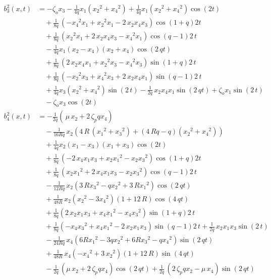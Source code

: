 \begin{align*}
b^2_3(x,t) &= -\zeta_o x_3 - \frac{1}{4q}{x_1\left({x_2}^2+{x_4}^2\right)}+ \frac{1}{4q}{x_1\left({x_2}^2 + {x_4}^2 \right) \cos(2t)}\\
&\quad + \frac{1}{8q}\,{\left(-{x_4}^2 x_1 + {x_2}^2 x_1 - 2\,x_2 x_4 x_3\right)\cos(1+q)2t}\\
&\quad +\frac{1}{8q}\,{\left
    ({x_2}^2x_1+2\,x_2x_4x_3-{x_4}^2x_1
   \right)\cos(q-1)2\,t}\\
&\quad - \frac{1}{4q}{x_1\left
    (x_2-x_4\right)\left(x_2+x_4\right)\cos
   (2\,qt)}\\
&\quad+\frac{1}{8q}\,{\left
    (2\,x_2x_4x_1+{x_2}^{2
    }x_3-{x_4}^2x_3\right)\sin(1+q)2\,t}\\
&\quad+\frac{1}{8q}\,{\left
    (-{x_2}^2x_3+{x_4}^2x_3+2\,x_2
    x_4x_1\right)\sin(q-1)2\,t}\\
&\quad+\frac{1}{4q}{x_3\left({
     x_2}^2+{x_4}^2\right
   )\sin(2\,t)}-\frac{1}{2q}\,{x_2
   x_4x_1\sin(2\,qt)}+\zeta_ox_1\sin(2\,t)\\
&\quad- \zeta_o x_3 \cos(2t)
\end{align*}
\begin{align*}
b^2_4(x,t) &= - \frac{1}{2q} \left(\,{\mu\,x_2 + 2\,\zeta_p q x_4}\right)\\
&\quad- \frac{1}{16{Rq}}\,{x_2 \left(4\,R \,({x_1}^2 + {x_3}^2) + (4\,Rq - q)({x_2}^2 + {x_4}^2) \right)}\\
&\quad + \frac{1}{4q}{x_2\left (x_1-x_3\right) \left(x_1+x_3\right)\cos(2t)}\\
&\quad + \frac{1}{8q}\,{ \left(-2\,x_4x_1x_3+x_2{x_1}^2-x_2{x_3}^2\right)\cos(1+q)2t}\\
&\quad +\frac{1}{8q}\,{\left(x_2{x_1}^2+2\,x_4x_1x_3-x_2{x_3}^2\right)\cos(q-1)2\,t}\\
&\quad -\frac{1}{12{Rq}}\,{x_2\left(3\,R{x_3}^2-q{x_2}^{2}+3\,R{x_1}^2\right)\cos(2\,qt)}\\
&\quad + \frac{1}{48{R}}\,{x_2 \left({x_2}^2 - 3{x_4}^2\right) \left(1+12\,R\right)\cos(4\,qt)}\\
&\quad + \frac{1}{8q} {\left(2\,x_2x_1x_3 + x_4{x_1}^2 - x_4{x_3}^2\right)\sin(1+q)2\,t}\\
&\quad + \frac{1}{8q} {\left(-x_4{x_3}^2+x_4{x_1}^2-2\,x_2x_1x_3\right)\sin(q-1)2\,t}+\frac{1}{2q}\,{x_2x_1 x_3\sin(2\,t)}\\
&\quad - \frac{1}{24{Rq}}\,{x_4\left (6R{x_1}^2 - 3q{x_2}^2 + 6R{x_3}^2 - q{x_4}^2\right)\sin(2\,qt)}\nonumber\\
&\quad + \frac{1}{48{R}}\,{x_4\left(-{x_4}^2+3\,{x_2}^2 \right)\left(1+12\,R\right)\sin(4\,qt)}\nonumber \\
&\quad - \frac{1}{2q}\,{\left(\mu\,x_2+2\, \zeta_pqx_4\right)\cos(2\,qt)} +\frac{1}{2q}\,{\left(2\,\zeta_pqx_2-\mu\,x_4\right) \sin(2\,qt)}
\end{align*}
